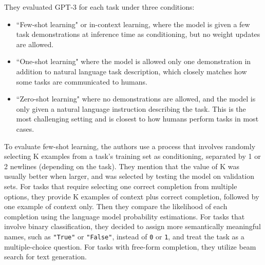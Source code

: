 \documentclass{article}
\begin{document}
\medskip
\noindent
They evaluated GPT-3 for each task under three conditions:
\begin{itemize}
    \item
        ``Few-shot learning" or in-context learning, where the model is given a few task demonstrations at inference time as conditioning, but no weight updates are allowed.
    \item
        ``One-shot learning" where the model is allowed only one demonstration in addition to natural language task description, which closely matches how some tasks are communicated to humans.
    \item
        ``Zero-shot learning" where no demonstrations are allowed, and the model is only given a natural language instruction describing the task. This is the most challenging setting and is closest to how humans perform tasks in most cases.
\end{itemize}

\noindent
To evaluate few-shot learning, the authors use a process that involves randomly selecting K examples from a task's training set as conditioning, separated by 1 or 2 newlines (depending on the task). They mention that the value of K was usually better when larger, and was selected by testing the model on validation sets. For tasks that require selecting one correct completion from multiple options, they provide K examples of context plus correct completion, followed by one example of context only. Then they compare the likelihood of each completion using the language model probability estimations. For tasks that involve binary classification, they decided to assign more semantically meaningful names, such as \texttt{"True"} or \texttt{"False"}, instead of \texttt{0} or \texttt{1}, and treat the task as a multiple-choice question. For tasks with free-form completion, they utilize beam search for text generation.
\end{document}
